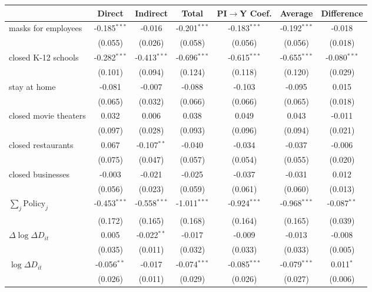 
\begin{tabular}{lccccc|>{}c}
\toprule
  & Direct & Indirect & Total & PI$\to$Y Coef. & Average & Difference\\
\midrule
masks for employees & -0.185$^{***}$ & -0.016 & -0.201$^{***}$ & -0.183$^{***}$ & -0.192$^{***}$ & -0.018\\
 & (0.055) & (0.026) & (0.058) & (0.056) & (0.056) & (0.018)\\
closed K-12 schools & -0.282$^{***}$ & -0.413$^{***}$ & -0.696$^{***}$ & -0.615$^{***}$ & -0.655$^{***}$ & -0.080$^{***}$\\
 & (0.101) & (0.094) & (0.124) & (0.118) & (0.120) & (0.029)\\
stay at home & -0.081 & -0.007 & -0.088 & -0.103 & -0.095 & 0.015\\
 & (0.065) & (0.032) & (0.066) & (0.066) & (0.065) & (0.018)\\
closed movie theaters & 0.032 & 0.006 & 0.038 & 0.049 & 0.043 & -0.011\\
 & (0.097) & (0.028) & (0.093) & (0.096) & (0.094) & (0.021)\\
closed restaurants & 0.067 & -0.107$^{**}$ & -0.040 & -0.034 & -0.037 & -0.006\\
 & (0.075) & (0.047) & (0.057) & (0.054) & (0.055) & (0.020)\\
closed businesses & -0.003 & -0.021 & -0.025 & -0.037 & -0.031 & 0.012\\
 & (0.056) & (0.023) & (0.059) & (0.061) & (0.060) & (0.013)\\
$\sum_j \mathrm{Policy}_j$ & -0.453$^{***}$ & -0.558$^{***}$ & -1.011$^{***}$ & -0.924$^{***}$ & -0.968$^{***}$ & -0.087$^{**}$\\
 & (0.172) & (0.165) & (0.168) & (0.164) & (0.165) & (0.039)\\
$\Delta \log \Delta D_{it}$ & 0.005 & -0.022$^{**}$ & -0.017 & -0.009 & -0.013 & -0.008\\
 & (0.035) & (0.011) & (0.032) & (0.033) & (0.033) & (0.005)\\
$\log \Delta D_{it}$ & -0.056$^{**}$ & -0.017 & -0.074$^{***}$ & -0.085$^{***}$ & -0.079$^{***}$ & 0.011$^{*}$\\
 & (0.026) & (0.011) & (0.029) & (0.026) & (0.027) & (0.006)\\
\bottomrule
\end{tabular}